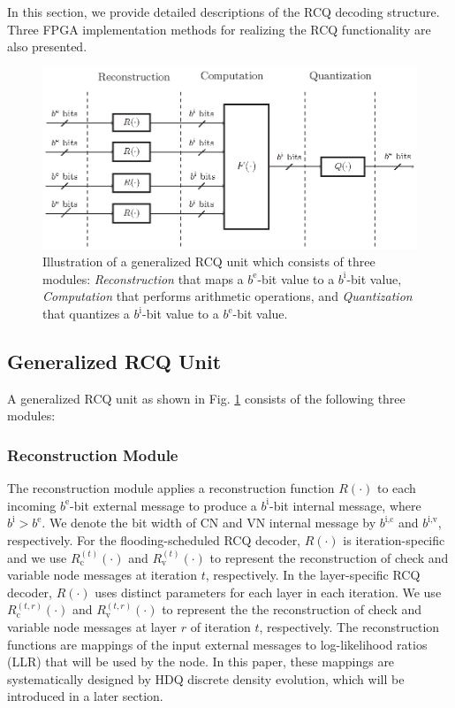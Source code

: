 \documentclass [PhD] {uclathes}
\begin{document}
In this section, we provide detailed descriptions of the RCQ decoding structure. Three FPGA implementation methods for realizing the RCQ functionality are also presented.
\begin{figure}[t]
    \centering
    \includegraphics[width=30pc]{figures/Generalized_RCQ_Structure.eps}
    \caption{Illustration of a generalized RCQ unit which consists of three modules: \emph{Reconstruction} that maps a $b^{\text{e}}$-bit value to a $b^{\text{i}}$-bit value, \emph{Computation} that performs arithmetic operations, and \emph{Quantization} that quantizes a $b^{\text{i}}$-bit value to a $b^{\text{e}}$-bit value.}
    \label{fig: RCQ}
\end{figure}

\subsection{Generalized RCQ Unit}\label{sec: g-rcq}


 A generalized RCQ unit as  shown in Fig. \ref{fig: RCQ} consists of the following three modules:

\subsubsection{Reconstruction Module}\label{sec: recons}The reconstruction module applies a reconstruction function $R(\cdot)$ to each incoming $b^{\text{e}}$-bit external message to produce a $b^{\text{i}}$-bit internal message, where $b^\text{i}>b^\text{e}$. We denote the bit width of CN and VN internal message by $b^{\text{i,c}}$ and $b^{\text{i,v}}$, respectively. For the flooding-scheduled RCQ decoder, $R(\cdot)$ is iteration-specific and we use $R^{(t)}_\text{c}(\cdot)$ and $R^{(t)}_\text{v}(\cdot)$ to represent the reconstruction of check and variable node messages at iteration $t$, respectively. In the layer-specific RCQ decoder, $R(\cdot)$ uses distinct parameters for each layer in each iteration.  We use $R_\text{c}^{(t,r)}(\cdot)$ and $R_\text{v}^{(t,r)}(\cdot)$ to represent the the reconstruction of check and variable node messages at  layer $r$ of iteration $t$, respectively. The reconstruction functions are mappings of the input external messages to log-likelihood ratios (LLR) that will be used by the node.  In this paper, these mappings are systematically designed by HDQ discrete density evolution, which will be introduced in a later section.
\end{document}
